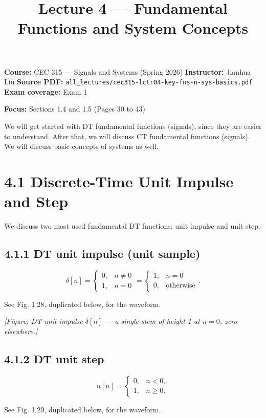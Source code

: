 \documentclass[11pt]{article}
\title{Lecture 4 — Fundamental Functions and System Concepts}
\author{}
\date{}
\begin{document}
\maketitle

\textbf{Course:} CEC 315 — Signals and Systems (Spring 2026)
\textbf{Instructor:} Jianhua Liu
\textbf{Source PDF:} \texttt{all\_lectures/cec315-lctr04-key-fns-n-sys-basics.pdf}
\textbf{Exam coverage:} Exam 1

\textbf{Focus:} Sections 1.4 and 1.5 (Pages 30 to 43)

We will get started with DT fundamental functions (signals), since they are easier to understand. After that, we will discuss CT fundamental functions (signals). We will discuss basic concepts of systems as well.

\section*{4.1 Discrete-Time Unit Impulse and Step}

We discuss two most used fundamental DT functions: unit impulse and unit step.

\subsection*{4.1.1 DT unit impulse (unit sample)}

\[\delta[n] = \begin{cases} 0, & n \neq 0 \\ 1, & n = 0 \end{cases} = \begin{cases} 1, & n = 0 \\ 0, & \text{otherwise} \end{cases}.\]

See Fig. 1.28, duplicated below, for the waveform.

\textit{[Figure: DT unit impulse $\delta[n]$ — a single stem of height 1 at $n = 0$, zero elsewhere.]}

\subsection*{4.1.2 DT unit step}

\[u[n] = \begin{cases} 0, & n < 0, \\ 1, & n \geq 0. \end{cases}\]

See Fig. 1.29, duplicated below, for the waveform.
\end{document}
